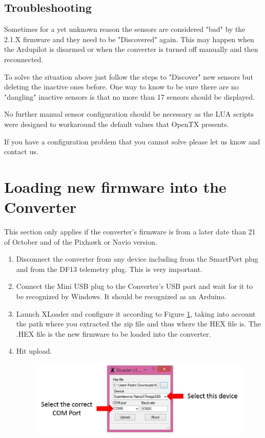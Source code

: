 \documentclass[english]{article}
\begin{document}
\subsection{Troubleshooting}

Sometimes for a yet unknown reason the sensors are considered "bad" by the 2.1.X firmware and they need to be "Discovered" again. This may happen when the Ardupilot is disarmed or when the converter is turned off manually and then reconnected.

To solve the situation above just follow the steps to "Discover" new sensors but deleting the inactive ones before. One way to know to be sure there are no "dangling" inactive sensors is that no more than 17 sensors should be displayed. 

No further manual sensor configuration should be necessary as the LUA scripts were designed to workaround the default values that OpenTX presents.

If you have a configuration problem that you cannot solve please let us know and contact us.

\section{Loading new firmware into the Converter}

This section only applies if the converter's firmware is from a later date than 21 of October and of the Pixhawk or Navio version.

\begin{enumerate}
\item Disconnect the converter from any device including from the SmartPort plug and from the DF13 telemetry plug. This is very important.

\item Connect the Mini USB plug to the Converter's USB port and wait for it to be recognized by Windows. It should be recognized as an Arduino.

\item Launch XLoader and configure it according to Figure \ref{fig:xloader}, taking into account the path where you extracted the zip file and thus where the HEX file is. The .HEX file is the new firmware to be loaded into the converter.

\item Hit upload.

\begin{figure}[h!]
\centering
\includegraphics[width=1.0\textwidth]{XLoader}
\label{fig:xloader}
\end{figure}

\end{enumerate}
\end{document}
